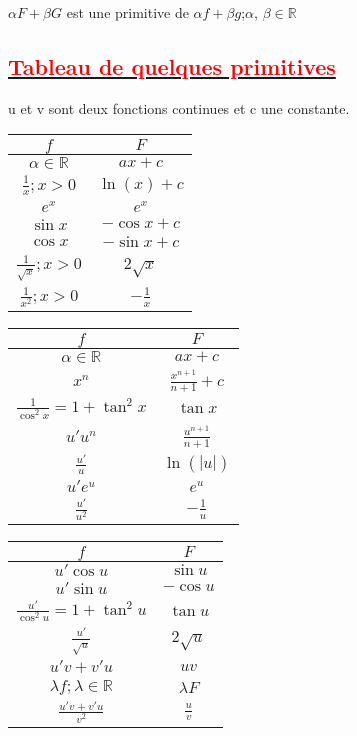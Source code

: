 \documentclass[12pt]{article}
\begin{document}
$\alpha F+\beta G$ est une primitive de $\alpha f+\beta g$;$\alpha $, $\beta \in \mathbb{R}$
\subsection*{\underline{\textbf{\textcolor{red}{Tableau de quelques primitives}}}}
u et v sont deux fonctions continues et c une constante.

\begin{minipage}[t]{0.5\textwidth}
\centering
\begin{tabular}{|c|c|}
\hline
$f$ & $F$\\
\hline
$\alpha \in \mathbb{R}$ & $ax+c$\\
\hline
$\frac{1}{x};x>0$ & $\ln(x)+c$\\
\hline
$e^{x}$ & $e^{x}$\\
\hline
$\sin x$ & $-\cos x +c$\\
\hline
$\cos x$ & $-\sin x +c$\\
\hline
$\frac{1}{\sqrt{x}}; x>0$ & $2\sqrt{x}$\\
\hline
$\frac{1}{x^{2}}; x>0$ & $-\frac{1}{x}$\\
\hline
\end{tabular}
\end{minipage}%
\begin{minipage}[t]{0.5\textwidth}
\centering
\begin{tabular}{|c|c|}
\hline
$f$ & $F$\\
\hline
$\alpha \in \mathbb{R}$ & $ax+c$\\
\hline
$x^{n}$ & $\frac{x^{n+1}}{n+1}+c$\\
\hline
$\frac{1}{\cos^{2} x}=1+\tan^{2} x$ & $\tan x$\\
\hline
$u'u^{n}$ & $\frac{u^{n+1}}{n+1}$\\
\hline
$\frac{u'}{u}$ & $\ln(|u|)$\\
\hline
$u'e^{u}$ & $e^{u}$\\
\hline
$\frac{u'}{u^{2}}$ & $-\frac{1}{u}$\\
\hline
\end{tabular}
\end{minipage}

\begin{tabular}{|c|c|}
\hline
$f$ & $F$\\
\hline
$u'\cos u$ & $\sin u$\\
\hline
$u'\sin u$ & $-\cos u$\\
\hline
$\frac{u'}{\cos^{2} u}=1+\tan^{2} u$ & $\tan u$\\
\hline
$\frac{u'}{\sqrt{u}}$ & $2\sqrt{u}$\\
\hline
$u'v+v'u$ & $uv$\\
\hline
$\lambda f; \lambda \in \mathbb{R}$ & $\lambda F$\\
\hline
$\frac{u'v+v'u}{v^{2}}$ & $\frac{u}{v}$\\
\hline
\end{tabular}
\end{document}
